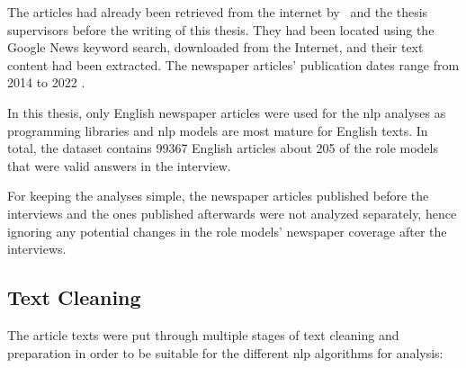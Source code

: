 The articles had already been retrieved from the internet by~\textcite{fenske_using_2022} and the thesis supervisors before the writing of this thesis. They had been located using the Google News keyword search, downloaded from the Internet, and their text content had been extracted. The newspaper articles' publication dates range from 2014 to 2022 \autocite{fenske_using_2022}.

In this thesis, only English newspaper articles were used for the \gls{nlp} analyses as programming libraries and \gls{nlp} models are most mature for English texts. In total, the dataset contains \SI{99367}{} English articles about \SI{205}{} of the role models that were valid answers in the interview.

For keeping the analyses simple, the newspaper articles published before the interviews and the ones published afterwards were not analyzed separately, hence ignoring any potential changes in the role models' newspaper coverage after the interviews.


\subsection*{Text Cleaning}
The article texts were put through multiple stages of text cleaning and preparation in order to be suitable for the different \gls{nlp} algorithms for analysis:

